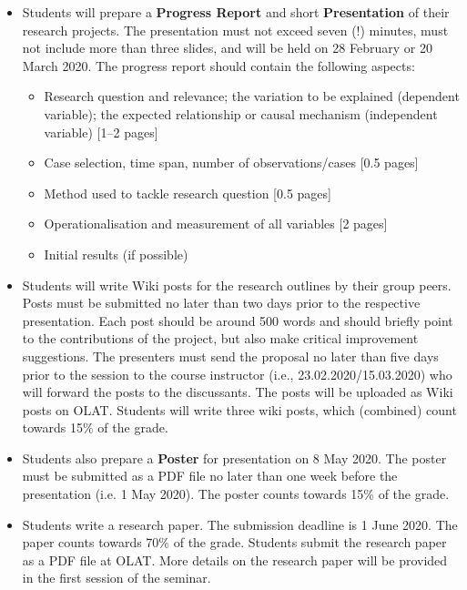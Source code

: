 \documentclass[abstract=on,parskip=full,headings=standardclasses,fontsize=11pt,paper=a4]{scrartcl}
\begin{document}
\begin{itemize}
\item Students will prepare a \textbf{Progress Report}  and short \textbf{Presentation} of their research projects. The presentation must not exceed seven (!) minutes, must not include more than three slides, and will be held on 28 February or 20 March 2020. The progress report should contain the following aspects:
\begin{itemize}
\item Research question and relevance; the variation to be explained (dependent variable); the expected relationship or causal mechanism (independent variable) [1--2 pages]
\item Case selection, time span, number of observations/cases [0.5 pages]
\item Method used to tackle research question [0.5 pages]
\item Operationalisation and measurement of all variables [2 pages]
\item Initial results (if possible)
\end{itemize}


\item Students will write Wiki posts for the research outlines by their group peers. Posts must be submitted no later than two days prior to the respective presentation.  Each post should be around 500 words and  should briefly point to the contributions of the project, but also make critical improvement suggestions. The presenters must send the proposal no later than five days prior to the session to the course instructor (i.e., 23.02.2020/15.03.2020) who will forward the posts to the discussants. The posts will be uploaded as Wiki posts on OLAT. Students will write three wiki posts, which (combined) count towards 15\% of the grade. 


\item Students also prepare a \textbf{Poster} for presentation on 8 May 2020. The poster must be submitted as a PDF file no later than one week before the presentation (i.e. 1 May 2020). The poster counts towards 15\% of the grade. 

\item Students write a research paper. The submission deadline is 1 June 2020. The paper counts towards 70\% of the grade.  Students submit the research paper as a PDF file at OLAT. More details on the research paper will be provided in the first session of the seminar.


\end{itemize}
\end{document}

